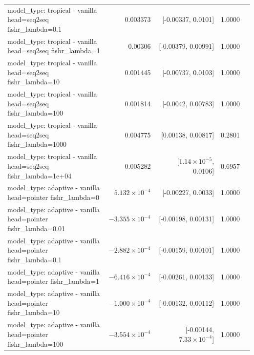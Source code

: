 \documentclass[10pt]{article}
\makeatletter
\newcommand{\stackcell}[1]{\begin{tabular}[t]{@{}l@{}}#1\end{tabular}}
\makeatother
\begin{document}
{\begin{longtable}{lrrrl}
\stackcell{model\_type: tropical - vanilla\\\footnotesize head=seq2seq fishr\_lambda=0.1 } & 0.003373 & [-0.00337, 0.0101] & 1.0000 & \\
\stackcell{model\_type: tropical - vanilla\\\footnotesize head=seq2seq fishr\_lambda=1 } & 0.00306 & [-0.00379, 0.00991] & 1.0000 & \\
\stackcell{model\_type: tropical - vanilla\\\footnotesize head=seq2seq fishr\_lambda=10 } & 0.001445 & [-0.00737, 0.0103] & 1.0000 & \\
\stackcell{model\_type: tropical - vanilla\\\footnotesize head=seq2seq fishr\_lambda=100 } & 0.001814 & [-0.0042, 0.00783] & 1.0000 & \\
\stackcell{model\_type: tropical - vanilla\\\footnotesize head=seq2seq fishr\_lambda=1000 } & 0.004775 & [0.00138, 0.00817] & 0.2801 & \\
\stackcell{model\_type: tropical - vanilla\\\footnotesize head=seq2seq fishr\_lambda=1e+04 } & 0.005282 & [$1.14\times10^{-5}$, 0.0106] & 0.6957 & \\
\stackcell{model\_type: adaptive - vanilla\\\footnotesize head=pointer fishr\_lambda=0 } & $5.132\times10^{-4}$ & [-0.00227, 0.0033] & 1.0000 & \\
\stackcell{model\_type: adaptive - vanilla\\\footnotesize head=pointer fishr\_lambda=0.01 } & $-3.355\times10^{-4}$ & [-0.00198, 0.00131] & 1.0000 & \\
\stackcell{model\_type: adaptive - vanilla\\\footnotesize head=pointer fishr\_lambda=0.1 } & $-2.882\times10^{-4}$ & [-0.00159, 0.00101] & 1.0000 & \\
\stackcell{model\_type: adaptive - vanilla\\\footnotesize head=pointer fishr\_lambda=1 } & $-6.416\times10^{-4}$ & [-0.00261, 0.00133] & 1.0000 & \\
\stackcell{model\_type: adaptive - vanilla\\\footnotesize head=pointer fishr\_lambda=10 } & $-1.000\times10^{-4}$ & [-0.00132, 0.00112] & 1.0000 & \\
\stackcell{model\_type: adaptive - vanilla\\\footnotesize head=pointer fishr\_lambda=100 } & $-3.554\times10^{-4}$ & [-0.00144, $7.33\times10^{-4}$] & 1.0000 & \\

\end{longtable}}
\end{document}
